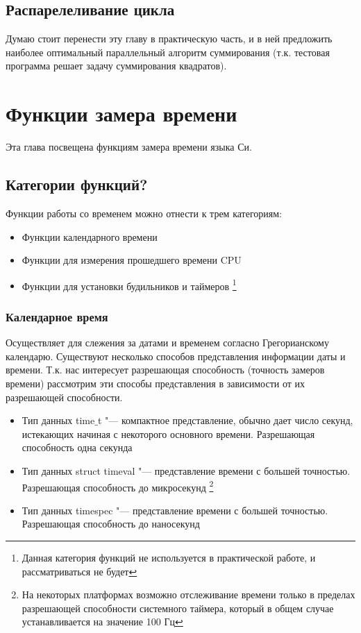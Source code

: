 \documentclass{article}
\begin{document}
		\subsection{Распарелеливание цикла}
			Думаю стоит перенести эту главу в практическую часть, и в ней предложить наиболее оптимальный параллельный алгоритм 			суммирования (т.к. тестовая программа решает задачу суммирования квадратов).
	\newpage
	\section{Функции замера времени}
		Эта глава посвещена функциям замера времени языка Си.
		\subsection{Категории функций?}	
			Функции работы со временем можно отнести к трем категориям:
			\begin{itemize} 
				\item Функции календарного времени 
				\item Функции для измерения прошедшего времени CPU
				\item Функции для установки будильников и таймеров
					\footnote{Данная категория функций не используется в практической работе, и рассматриваться не будет}
			\end{itemize}
			\subsubsection{Календарное время}
				 Осуществляет для слежения за датами и временем согласно Грегорианскому календарю. Существуют несколько способов 				представления информации даты и времени. Т.к. нас интересует разрешающая способность (точность замеров времени) 					рассмотрим эти способы представления в зависимости от их разрешающей способности.
			\begin{itemize} 
				\item Тип данных time$\_$t "---  компактное представление, обычно дает число секунд, истекающих начиная с 								некоторого основного времени. Разрешающая способность одна секунда
				\item Тип данных struct timeval "--- представление времени с большей точностью. Разрешающая способность до 								микросекунд
					\footnote{На некоторых платформах возможно отслеживание времени только в пределах разрешающей способности 							системного таймера, который в общем случае устанавливается на значение 100 Гц}
				\item Тип данных timespec  "--- представление времени с большей точностью. Разрешающая способность до 									наносекунд
			\end{itemize}	 
\end{document}

